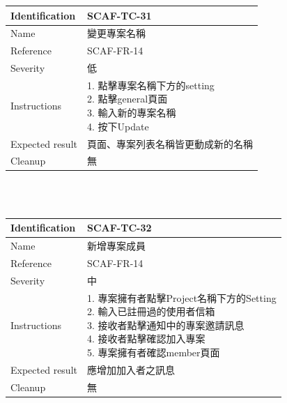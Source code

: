 \documentclass{report}
\begin{document}
\begin{tabularx}{\textwidth}{
  |p{}%
  |p{}|%
  }
  \hline
  \centering Identification &  SCAF-TC-31 \\
  \hline
  \centering Name & 變更專案名稱 \\
  \hline
  \centering Reference & SCAF-FR-14 \\
  \hline
  \centering Severity & 低 \\
  \hline
  \centering Instructions & 
  \makecell[l]{
    1. 點擊專案名稱下方的setting \\
    2. 點擊general頁面 \\
    3. 輸入新的專案名稱 \\
    4. 按下Update 
  }\\
  \hline
  \centering Expected result & 頁面、專案列表名稱皆更動成新的名稱 \\
  \hline
  \centering Cleanup & 無 \\
  \hline
\end{tabularx}
\\
\newline
\\
\begin{tabularx}{\textwidth}{
  |p{}%
  |p{}|%
  }
  \hline
  \centering Identification &  SCAF-TC-32 \\
  \hline
  \centering Name & 新增專案成員 \\
  \hline
  \centering Reference & SCAF-FR-14 \\
  \hline
  \centering Severity & 中 \\
  \hline
  \centering Instructions & 
  \makecell[l]{
    1. 專案擁有者點擊Project名稱下方的Setting \\
    2. 輸入已註冊過的使用者信箱 \\
    3. 接收者點擊通知中的專案邀請訊息 \\
    4. 接收者點擊確認加入專案 \\
    5. 專案擁有者確認member頁面
  }\\
  \hline
  \centering Expected result & 應增加加入者之訊息 \\
  \hline
  \centering Cleanup & 無 \\
  \hline
\end{tabularx}
\\
\newline
\end{document}
